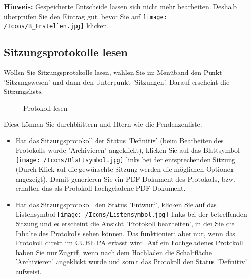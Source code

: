 \vspace{.5cm}

\textbf{Hinweis:} Gespeicherte Entscheide lassen sich nicht mehr bearbeiten. Deshalb überprüfen Sie den Eintrag gut, bevor Sie auf \texttt{[image: /Icons/B\_Erstellen.jpg]} klicken.

\subsection{Sitzungsprotokolle lesen}

Wollen Sie Sitzungsprotokolle lesen, wählen Sie im Menüband den Punkt 'Sitzungswesen' und dann den Unterpunkt 'Sitzungen'. Darauf erscheint die Sitzungsliste.

\begin{figure}[H]
\caption{Protokoll lesen}
\end{figure}

Diese können Sie durchblättern und filtern wie die Pendenzenliste.

\begin{itemize}
\item
Hat das Sitzungsprotokoll der Status 'Definitiv' (beim Bearbeiten des Protokolls wurde 'Archivieren' angeklickt), klicken Sie auf das Blattsymbol \texttt{[image: /Icons/Blattsymbol.jpg]}  links bei der entsprechenden Sitzung (Durch Klick auf die gewünschte Sitzung werden die möglichen Optionen angezeigt). Damit generieren Sie ein PDF-Dokument des Protokolls, bzw. erhalten das als Protokoll hochgeladene PDF-Dokument.
\item
Hat das Sitzungsprotokoll den Status 'Entwurf', klicken Sie auf das Listensymbol \texttt{[image: /Icons/Listensymbol.jpg]}  links bei der betreffenden Sitzung und es erscheint die Ansicht 'Protokoll bearbeiten', in der Sie die Inhalte des Protokolls sehen können. Das funktioniert aber nur, wenn das Protokoll direkt im CUBE PA erfasst wird. Auf ein hochgeladenes Protokoll haben Sie nur Zugriff, wenn nach dem Hochladen die Schaltfläche 'Archivieren' angeklickt wurde und somit das Protokoll den Status 'Definitiv' aufweist.
\end{itemize}


